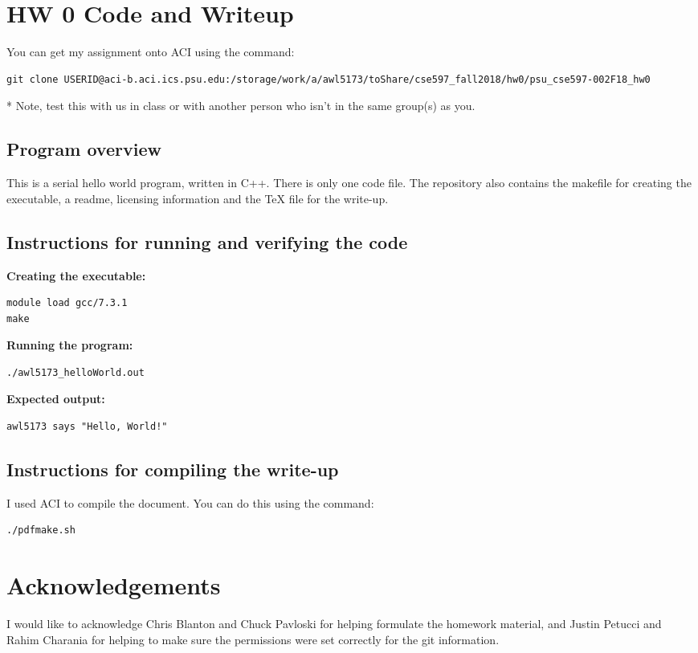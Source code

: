 \documentclass{article}
\begin{document}
\begin{spacing}{1.1}
\section{HW 0 Code and Writeup}

You can get my assignment onto ACI using the command:

\begin{verbatim}
git clone USERID@aci-b.aci.ics.psu.edu:/storage/work/a/awl5173/toShare/cse597_fall2018/hw0/psu_cse597-002F18_hw0
\end{verbatim}

* Note, test this with us in class or with another person who isn't in the same group(s) as you.

\subsection{Program overview}

This is a serial hello world program, written in C++. There is only one code file. The repository also contains the makefile for creating the executable, a readme, licensing information and the TeX file for the write-up.


\subsection{Instructions for running and verifying the code}

\textbf{Creating the executable:}
\begin{verbatim}
module load gcc/7.3.1
make
\end{verbatim}

\textbf{Running the program:}
\begin{verbatim}
./awl5173_helloWorld.out
\end{verbatim}

\textbf{Expected output:}
\begin{verbatim}
awl5173 says "Hello, World!"
\end{verbatim}

\subsection{Instructions for compiling the write-up}

I used ACI to compile the document.  You can do this using the command:
\begin{verbatim}
./pdfmake.sh
\end{verbatim}

\section{Acknowledgements}

I would like to acknowledge Chris Blanton and Chuck Pavloski for helping formulate the homework material, and Justin Petucci and Rahim Charania for helping to make sure the permissions were set correctly for the git information.




\end{spacing}
\end{document}
